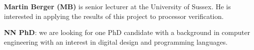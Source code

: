 \documentclass[fleqn,12pt]{article}
\begin{document}
{\bf Martin Berger (MB)} is senior lecturer at the University of Sussex.
He is interested in applying the results of this project to processor verification.

{\bf NN PhD}: we are looking for one PhD candidate with a background in computer engineering
with an interest in digital design and programming languages.

%
\end{document}
